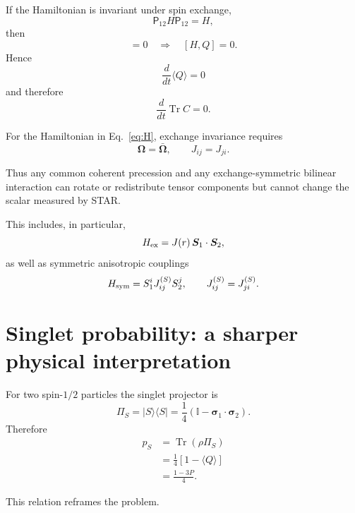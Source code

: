 \documentclass[11pt]{article}
\newcommand{\Id}{\mathbb I}
\newcommand{\Trc}{\operatorname{Tr}}
\begin{document}
If the Hamiltonian is invariant under spin exchange,
\begin{equation}
\mathsf P_{12}H\mathsf P_{12}=H,
\end{equation}
then
\begin{equation}
[H,\mathsf P_{12}]=0
\quad\Longrightarrow\quad
[H,Q]=0.
\end{equation}
Hence
\begin{equation}
\boxed{
\frac{d}{dt}\langle Q\rangle=0
}
\end{equation}
and therefore
\begin{equation}
\boxed{
\frac{d}{dt}\Trc C=0.
}
\label{eq:protect}
\end{equation}

For the Hamiltonian in Eq.~\eqref{eq:H}, exchange invariance requires
\begin{equation}
\boxed{
\bm\Omega=\bar{\bm\Omega},
\qquad
J_{ij}=J_{ji}.
}
\label{eq:conds}
\end{equation}

Thus any common coherent precession and any exchange-symmetric bilinear interaction can rotate
or redistribute tensor components but cannot change the scalar measured by STAR.

This includes, in particular,
\begin{equation}
H_{\rm ex}
=
J(r)\,\bm S_1\cdot\bm S_2,
\end{equation}
as well as symmetric anisotropic couplings
\begin{equation}
H_{\rm sym}
=
S_1^iJ^{(S)}_{ij}S_2^j,
\qquad
J^{(S)}_{ij}=J^{(S)}_{ji}.
\end{equation}

\section{Singlet probability: a sharper physical interpretation}

For two spin-$1/2$ particles the singlet projector is
\begin{equation}
\Pi_S
=
|S\rangle\langle S|
=
\frac14
\left(
\Id-\bm\sigma_1\cdot\bm\sigma_2
\right).
\end{equation}
Therefore
\begin{align}
p_S
&=
\Trc(\rho\Pi_S)\\
&=
\frac14
\left[
1-\langle Q\rangle
\right]\\
&=
\boxed{
\frac{1-3P}{4}
}.
\label{eq:pS}
\end{align}

This relation reframes the problem.
\end{document}
